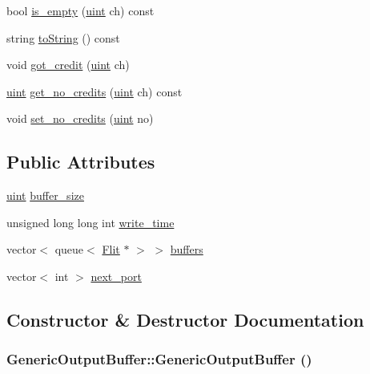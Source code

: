 \begin{CompactItemize}
\item 
bool \hyperlink{classGenericOutputBuffer_df867815a21d8e832ba19aa63fa65e55}{is\_\-empty} (\hyperlink{outputBuffer_8h_91ad9478d81a7aaf2593e8d9c3d06a14}{uint} ch) const 
\item 
string \hyperlink{classGenericOutputBuffer_746612d97dbd6240764632638931d3fa}{toString} () const 
\item 
void \hyperlink{classGenericOutputBuffer_a61d09c8b3fcdd15b71f1b01d28ea748}{got\_\-credit} (\hyperlink{outputBuffer_8h_91ad9478d81a7aaf2593e8d9c3d06a14}{uint} ch)
\item 
\hyperlink{outputBuffer_8h_91ad9478d81a7aaf2593e8d9c3d06a14}{uint} \hyperlink{classGenericOutputBuffer_20a0a495d2b0aa4e6c6539209038ab2c}{get\_\-no\_\-credits} (\hyperlink{outputBuffer_8h_91ad9478d81a7aaf2593e8d9c3d06a14}{uint} ch) const 
\item 
void \hyperlink{classGenericOutputBuffer_632ffda3db2c9729e2d9d6d1645defb3}{set\_\-no\_\-credits} (\hyperlink{outputBuffer_8h_91ad9478d81a7aaf2593e8d9c3d06a14}{uint} no)
\end{CompactItemize}
\subsection*{Public Attributes}
\begin{CompactItemize}
\item 
\hyperlink{outputBuffer_8h_91ad9478d81a7aaf2593e8d9c3d06a14}{uint} \hyperlink{classGenericOutputBuffer_98d12e7f17f1ce56b89db973b9efe7b0}{buffer\_\-size}
\item 
unsigned long long int \hyperlink{classGenericOutputBuffer_f201a673a51bd864907116c48a053f97}{write\_\-time}
\item 
vector$<$ queue$<$ \hyperlink{classFlit}{Flit} $\ast$ $>$ $>$ \hyperlink{classGenericOutputBuffer_561cd725dc95f8c57fda666df9980313}{buffers}
\item 
vector$<$ int $>$ \hyperlink{classGenericOutputBuffer_fadacb202322788766670e54b1d8430c}{next\_\-port}
\end{CompactItemize}


\subsection{Constructor \& Destructor Documentation}
\hypertarget{classGenericOutputBuffer_10c4287e27f634982bc28e1de2b31757}{
\subsubsection[{GenericOutputBuffer}]{\setlength{\rightskip}{0pt plus 5cm}GenericOutputBuffer::GenericOutputBuffer ()}}
\label{classGenericOutputBuffer_10c4287e27f634982bc28e1de2b31757}


